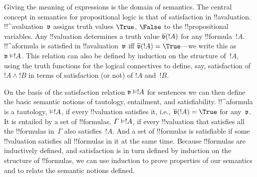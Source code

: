 \documentclass[../../../include/open-logic-section]{subfiles}
\begin{document}
Giving the meaning of expressions is the domain of semantics.  The
central concept in semantics for propositional logic is that of
satisfaction in !!a{valuation}. !!^a{valuation}~$\pAssign{v}$ assigns
truth values $\True$, $\False$ to the !!{propositional variable}s. Any
!!{valuation} determines a truth value $\pValue{v}(!A)$ for any
!!{formula}~$!A$.  !!^a{formula} is satisfied in
!!a{valuation}~$\pAssign{v}$ iff $\pValue{v}(!A) = \True$---we write
this as $\pSat{v}{!A}$. This relation can also be defined by induction on
the structure of~$!A$, using the truth functions for the logical
connectives to define, say, satisfaction of $!A \land !B$ in terms of
satisfaction (or not) of $!A$ and~$!B$.

On the basis of the satisfaction relation $\pSat{v}{!A}$ for sentences
we can then define the basic semantic notions of tautology,
entailment, and satisfiability.  !!^a{formula} is a tautology,
$\Entails !A$, if every !!{valuation} satisfies it, i.e.,
$\pValue{v}(!A) = \True$ for any~$\pAssign{v}$. It is entailed by a
set of !!{formula}s, $\Gamma \Entails !A$, if every !!{valuation} that
satisfies all the !!{formula}s in~$\Gamma$ also satisfies~$!A$. And a
set of !!{formula}s is satisfiable if some !!{valuation} satisfies all
!!{formula}s in it at the same time.  Because !!{formula}s are
inductively defined, and satisfaction is in turn defined by induction
on the structure of !!{formula}s, we can use induction to prove
properties of our semantics and to relate the semantic notions
defined.
\end{document}
